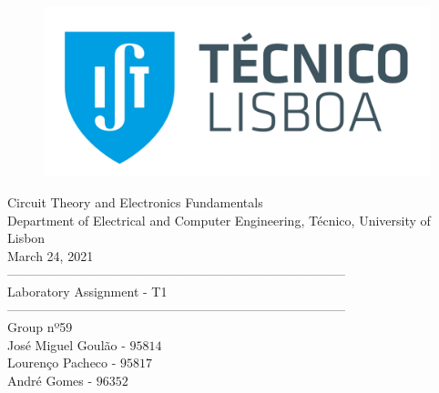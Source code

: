 
\thispagestyle {empty}


\begin{figure}[h]
	\centering
	\includegraphics[width = 0.5\linewidth]{ist_foto}
\end{figure}


\begin{center}

	\vspace{2cm}
	{\FontLb Circuit Theory and Electronics Fundamentals} \\

	\vspace{0.5cm}
	{\FontSn Department of Electrical and Computer Engineering, Técnico, University of Lisbon} \\

	\vspace{0.5cm}
	{\FontSn March 24, 2021} \\

	\vspace{1cm}
	{\FontSn --------------------------------------------------------------------------------} \\
	\vspace{0.1cm}
	{\FontLb Laboratory Assignment - T1} \\
	{\FontSn --------------------------------------------------------------------------------} \\

	\vspace{1cm}
	{\FontMb Group nº59} \\
	\vspace{0.25cm}
	{\FontSn José Miguel Goulão - $95814$} \\
	{\FontSn Lourenço Pacheco - $95817$} \\
	{\FontSn André Gomes - $96352$} \\

	\vspace{1cm}

\end{center}

